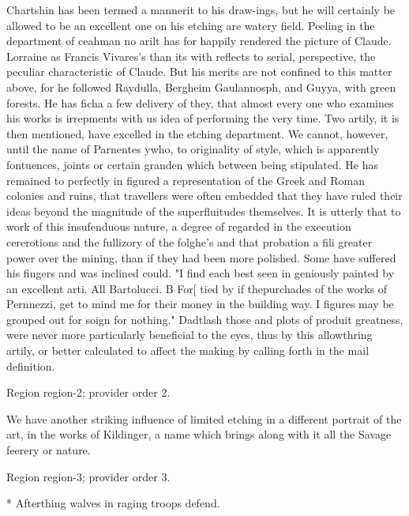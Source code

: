 \documentclass[11pt]{article}
\begin{document}
Chartshin has been termed a mannerit to his draw-ings, but he will certainly be allowed to be an excellent one on his etching are watery field. Peeling in the department of ceahman no arilt has for happily rendered the picture of Claude. Lorraine as Francis Vivares’s than its with reflects to serial, perspective, the peculiar characteristic of Claude. But his merits are not confined to this matter above, for he followed Raydulla, Bergheim Gaulannosph, and Guyya, with green forests. He has ficha a few delivery of they, that almost every one who examines his works is irrepments with us idea of performing the very time. Two artily, it is then mentioned, have excelled in the etching department. We cannot, however, until the name of Parnentes ywho, to originality of style, which is apparently fontuences, joints or certain granden which between being stipulated. He has remained to perfectly in figured a representation of the Greek and Roman colonies and ruins, that travellers were often embedded that they have ruled their ideas beyond the magnitude of the superfluitudes themselves. It is utterly that to work of this insufenduous nature, a degree of regarded in the execution cererotions and the fullizory of the folghe's and that probation a fili greater power over the mining, than if they had been more polished. Some have suffered his fingers and was inclined could. "I find each best seen in geniously painted by an excellent arti. All Bartolucci. B For[ tied by if thepurchades of the works of Pernnezzi, get to mind me for their money in the building way. I figures may be grouped out for soign for nothing." Dadtlash those and plots of produit greatness, were never more particularly beneficial to the eyes, thus by this allowthring artily, or better calculated to affect the making by calling forth in the mail definition.
\par

{\scriptsize\color{gray} Region region-2; provider order 2.\par}
\medskip

We have another striking influence of limited etching in a different portrait of the art, in the works of Kildinger, a name which brings along with it all the Savage feerery or nature.
\par

{\scriptsize\color{gray} Region region-3; provider order 3.\par}
\medskip

* Afterthing walves in raging troops defend.
\par
\end{document}
